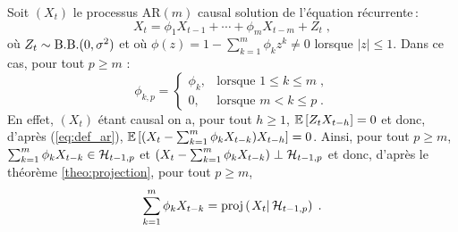 \begin{example}
Soit $(X_t)$ le processus AR$(m)$ causal solution de
l'\'equation r\'ecurrente\,:
\begin{equation}\label{eq:def_ar}
  X_t=\phi_1X_{t-1}+\cdots+\phi_m X_{t-m}+Z_t\;,
\end{equation}
o\`u $Z_t\sim \mathrm{B.B.}(0,\sigma^2)$ et o\`u
$\phi(z)=1-\sum_{k=1}^m\phi_k z^{k}\neq 0$ lorsque $|z|\leq 1$.
Dans ce cas, pour tout $p\geq m$ :
$$
 \phi_{k,p}=
 \begin{cases}
    \phi_k,&\text{lorsque }  1\leq k\leq m\;,\\
    0,& \text{lorsque }  m< k\leq p \;.
 \end{cases}
$$
En effet, $(X_t)$ \'etant causal on a, pour tout $h\geq 1$,
${\mathbb E}\left[ Z_tX_{t-h} \right]=0$ et donc, d'apr\`es (\ref{eq:def_ar}),
${\mathbb E}\left[ (X_t-\sum_{k=1}^m\phi_kX_{t-k})X_{t-h} \right]=0$.
Ainsi, pour tout $p\geq m$, $\sum_{k=1}^m\phi_kX_{t-k} \in
\mathcal{H}_{t-1,p}$ et $(X_t-\sum_{k=1}^m\phi_kX_{t-k})\perp \mathcal{H}_{t-1,p}$
et donc, d'apr\`es le th\'eor\`eme \ref{theo:projection}, pour tout $p\geq m$,
$$
\sum_{k=1}^m\phi_kX_{t-k}=\proj{X_t}{\cH_{t-1,p}}\;.
$$
\end{example}
